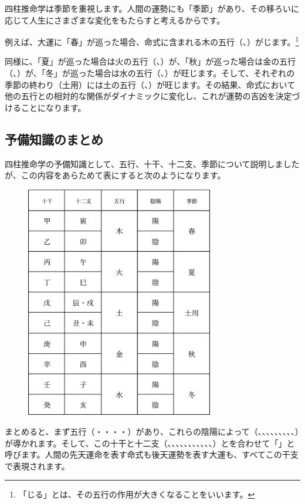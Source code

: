 \documentclass[a5paper,11pt,dvipdfmx]{tarticle}
\begin{document}
四柱推命学は季節を重視します。人間の運勢にも「季節」があり、その移ろいに応じて人生にさまざまな変化をもたらすと考えるからです。

例えば、大運に「春」が巡った場合、命式に含まれる木の五行（、）がじます。\footnote{「じる」とは、その五行の作用が大きくなることをいいます。}

同様に、「夏」が巡った場合は火の五行（、）が、「秋」が巡った場合は金の五行（、）が、「冬」が巡った場合は水の五行（、）が旺じます。そして、それぞれの季節の終わり（土用）には土の五行（、）が旺じます。その結果、命式において他の五行との相対的な関係がダイナミックに変化し、これが運勢の吉凶を決定づけることになります。


\subsection{予備知識のまとめ}

四柱推命学の予備知識として、五行、十干、十二支、季節について説明しましたが、この内容をあらためて表にすると次のようになります。

\begin{figure}[hbp]
  \centering
  \includegraphics[width=82mm,angle=90]{figs/table2-5.eps}
\end{figure}

まとめると、まず五行（・・・・）があり、これらの陰陽によって（、、、、、、、、、）が導かれます。そして、この十干と十二支（、、、、、、、、、、、）とを合わせて「」と呼びます。人間の先天運命を表す命式も後天運勢を表す大運も、すべてこの干支で表現されます。
\end{document}
